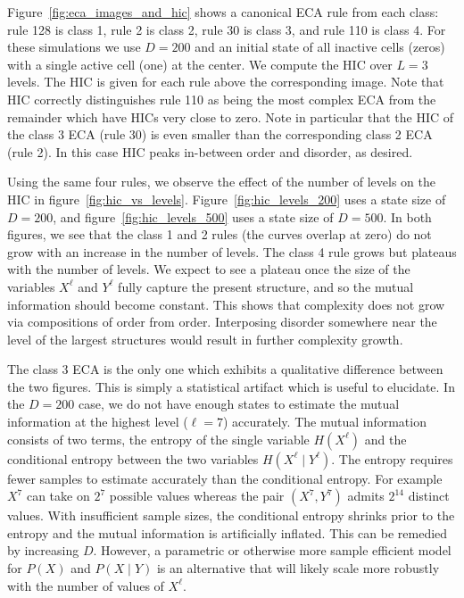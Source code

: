Figure~\ref{fig:eca_images_and_hic} shows a canonical ECA rule from each
class: rule 128 is class 1, rule 2 is class 2, rule 30 is class 3, and rule 110
is class 4. For these simulations we use $D=200$ and an initial state of all
inactive cells (zeros) with a single active cell (one) at the center. We
compute the HIC over $L=3$ levels. The HIC is given for each rule above the
corresponding image. Note that HIC correctly distinguishes rule 110 as being
the most complex ECA from the remainder which have HICs very close to zero.
Note in particular that the HIC of the class 3 ECA (rule 30) is even smaller
than the corresponding class 2 ECA (rule 2). In this case HIC peaks in-between
order and disorder, as desired.

Using the same four rules, we observe the effect of the number of levels on the
HIC in figure~\ref{fig:hic_vs_levels}. Figure~\ref{fig:hic_levels_200} uses a
state size of $D=200$, and figure~\ref{fig:hic_levels_500} uses a state size of
$D=500$. In both figures, we see that the class 1 and 2 rules (the curves
overlap at zero) do not grow with an increase in the number of levels. The
class 4 rule grows but plateaus with the number of levels. We expect to see a
plateau once the size of the variables $X^\ell$ and $Y^\ell$ fully capture the
present structure, and so the mutual information should become constant. This
shows that complexity does not grow via compositions of order from order.
Interposing disorder somewhere near the level of the largest structures would
result in further complexity growth.

The class 3 ECA is the only one which exhibits a qualitative difference between
the two figures. This is simply a statistical artifact which is useful to
elucidate. In the $D=200$ case, we do not have enough states to estimate the
mutual information at the highest level ($\ell = 7$) accurately. The mutual
information consists of two terms, the entropy of the single variable
$H(X^\ell)$ and the conditional entropy between the two variables $H(X^\ell
\mid Y^\ell)$. The entropy requires fewer samples to estimate accurately than
the conditional entropy. For example $X^7$ can take on $2^7$ possible values
whereas the pair $(X^7, Y^7)$ admits $2^{14}$ distinct values. With
insufficient sample sizes, the conditional entropy shrinks prior to the entropy
and the mutual information is artificially inflated. This can be remedied by
increasing $D$. However, a parametric or otherwise more sample efficient model
for $P(X)$ and $P(X \mid Y)$ is an alternative that will likely scale more
robustly with the number of values of $X^\ell$.

